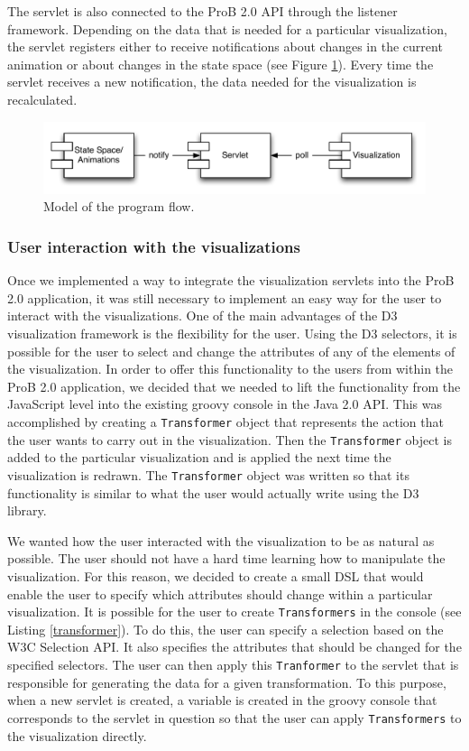 The servlet is also connected to the ProB 2.0 API through the listener framework. Depending on the data that is needed for a particular visualization, the servlet registers either to receive notifications about changes in the current animation or about changes in the state space (see Figure \ref{programFlow}). Every time the servlet receives a new notification, the data needed for the visualization is recalculated.

\begin{figure}[h!]
\centering
\includegraphics[width=14cm]{bilder/programFlow.pdf}
\caption{Model of the program flow.}
\label{programFlow}
\end{figure}

\subsubsection{User interaction with the visualizations}

Once we implemented a way to integrate the visualization servlets into the ProB 2.0 application, it was still necessary to implement an easy way for the user to interact with the visualizations. One of the main advantages of the D3 visualization framework is the flexibility for the user. Using the D3 selectors, it is possible for the user to select and change the attributes of any of the elements of the visualization. In order to offer this functionality to the users from within the ProB 2.0 application, we decided that we needed to lift the functionality from the JavaScript level into the existing groovy console in the Java 2.0 API. This was accomplished by creating a \texttt{Transformer} object that represents the action that the user wants to carry out in the visualization. Then the \texttt{Transformer} object is added to the particular visualization and is applied the next time the visualization is redrawn. The \texttt{Transformer} object was written so that its functionality is similar to what the user would actually write using the D3 library.

We wanted how the user interacted with the visualization to be as natural as possible. The user should not have a hard time learning how to manipulate the visualization. For this reason, we decided to create a small DSL that would enable the user to specify which attributes should change within a particular visualization. It is possible for the user to create \texttt{Transformers} in the console (see Listing \ref{transformer}). To do this, the user can specify a selection based on the W3C Selection API. It also specifies the attributes that should be changed for the specified selectors. The user can then apply this \texttt{Tranformer} to the servlet that is responsible for generating the data for a given transformation. To this purpose, when a new servlet is created, a variable is created in the groovy console that corresponds to the servlet in question so that the user can apply \texttt{Transformers} to the visualization directly.


